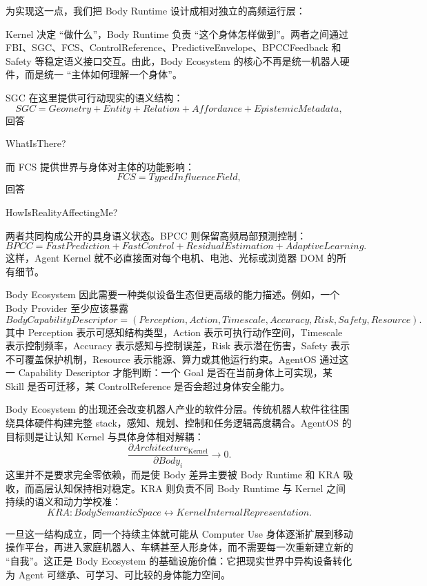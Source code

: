 为实现这一点，我们把 Body Runtime 设计成相对独立的高频运行层：
\begin{statementbox}
\centering
{}
\end{statementbox}
Kernel 决定 ``做什么''，Body Runtime 负责 ``这个身体怎样做到''。两者之间通过 FBI、SGC、FCS、ControlReference、PredictiveEnvelope、BPCCFeedback 和 Safety 等稳定语义接口交互。由此，Body Ecosystem 的核心不再是统一机器人硬件，而是统一 ``主体如何理解一个身体''。

SGC 在这里提供可行动现实的语义结构：
\[
SGC
=
Geometry
+
Entity
+
Relation
+
Affordance
+
EpistemicMetadata,
\]
回答
\begin{statementbox}
WhatIsThere?
\end{statementbox}
而 FCS 提供世界与身体对主体的功能影响：
\[
FCS
=
TypedInfluenceField,
\]
回答
\begin{statementbox}
HowIsRealityAffectingMe?
\end{statementbox}
两者共同构成公开的具身语义状态。BPCC 则保留高频局部预测控制：
\[
BPCC
=
FastPrediction
+
FastControl
+
ResidualEstimation
+
AdaptiveLearning.
\]
这样，Agent Kernel 就不必直接面对每个电机、电池、光标或浏览器 DOM 的所有细节。

Body Ecosystem 因此需要一种类似设备生态但更高级的能力描述。例如，一个 Body Provider 至少应该暴露
\[
BodyCapabilityDescriptor
=
(
Perception,
Action,
Timescale,
Accuracy,
Risk,
Safety,
Resource
).
\]
其中 Perception 表示可感知结构类型，Action 表示可执行动作空间，Timescale 表示控制频率，Accuracy 表示感知与控制误差，Risk 表示潜在伤害，Safety 表示不可覆盖保护机制，Resource 表示能源、算力或其他运行约束。AgentOS 通过这一 Capability Descriptor 才能判断：一个 Goal 是否在当前身体上可实现，某 Skill 是否可迁移，某 ControlReference 是否会超过身体安全能力。

Body Ecosystem 的出现还会改变机器人产业的软件分层。传统机器人软件往往围绕具体硬件构建完整 stack，感知、规划、控制和任务逻辑高度耦合。AgentOS 的目标则是让认知 Kernel 与具体身体相对解耦：
\[
\frac{\partial Architecture_{\mathrm{Kernel}}}
{\partial Body_i}
\rightarrow 0.
\]
这里并不是要求完全零依赖，而是使 Body 差异主要被 Body Runtime 和 KRA 吸收，而高层认知保持相对稳定。KRA 则负责不同 Body Runtime 与 Kernel 之间持续的语义和动力学校准：
\[
KRA:
BodySemanticSpace
\leftrightarrow
KernelInternalRepresentation.
\]

一旦这一结构成立，同一个持续主体就可能从 Computer Use 身体逐渐扩展到移动操作平台，再进入家庭机器人、车辆甚至人形身体，而不需要每一次重新建立新的 ``自我''。这正是 Body Ecosystem 的基础设施价值：它把现实世界中异构设备转化为 Agent 可继承、可学习、可比较的身体能力空间。

